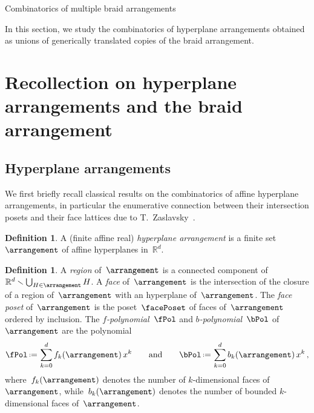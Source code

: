 \documentclass{amsart}
\makeatletter
\newcommand{\darkblue}{\color{darkblue}} %
\theoremstyle{definition}
\newtheorem{definition}[theorem]{Definition}
\newcommand{\R}{\mathbb{R}} %
\newcommand{\ssm}{\smallsetminus} %
\newcommand{\eqdef}{\mbox{\,\raisebox{0.2ex}{\scriptsize\ensuremath{\mathrm:}}\ensuremath{=}\,}} %
\newcommand{\defn}[1]{\textsl{\darkblue #1}} %
\def\part{\@startsection{part}{1}%
\z@{.7\linespacing\@plus\linespacing}{.8\linespacing}%
{\LARGE\sffamily\centering}}
\makeatother
\begin{document}

\clearpage
\part{Combinatorics of multiple braid arrangements}
\label{part:combinatorics}

In this section, we study the combinatorics of hyperplane arrangements obtained as unions of generically translated copies of the braid arrangement.


\section{Recollection on hyperplane arrangements and the braid arrangement}
\label{sec:arrangements}


\subsection{Hyperplane arrangements}
\label{subsec:arrangements}

We first briefly recall classical results on the combinatorics of affine hyperplane arrangements, in particular the enumerative connection between their intersection posets and their face lattices due to T.~Zaslavsky~\cite{Zaslavsky}.

\begin{definition}
A (finite affine real) \defn{hyperplane arrangement} is a finite set~$\arrangement$ of affine hyperplanes in~$\R^d$.
\end{definition}

\begin{definition}
A \defn{region} of~$\arrangement$ is a connected component of~$\R^d \ssm \bigcup_{H \in \arrangement} H$.
A \defn{face} of~$\arrangement$ is the intersection of the closure of a region of~$\arrangement$ with an hyperplane of~$\arrangement$.
The \defn{face poset} of~$\arrangement$ is the poset~$\facePoset$ of faces of~$\arrangement$ ordered by inclusion.
The \defn{$f$-polynomial}~$\fPol$ and \defn{$b$-polynomial}~$\bPol$ of~$\arrangement$ are the polynomial
\[
\fPol \eqdef \sum_{k = 0}^d f_k(\arrangement) \, x^k
\qquad\text{and}\qquad
\bPol \eqdef \sum_{k = 0}^d b_k(\arrangement) \, x^k \, ,
\]
where~$f_k(\arrangement)$ denotes the number of $k$-dimensional faces of~$\arrangement$, while~$b_k(\arrangement)$ denotes the number of bounded $k$-dimensional faces of~$\arrangement$.
\end{definition}
\end{document}

